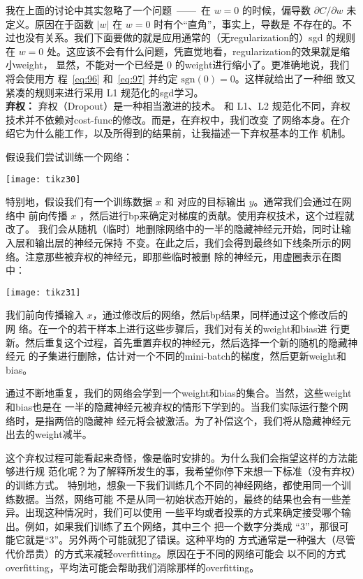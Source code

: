 我在上面的讨论中其实忽略了一个问题~——~在 $w=0$ 的时候，偏导数 $\partial
C/\partial w$ 未定义。原因在于函数 $|w|$ 在 $w=0$ 时有个“直角”，事实上，导数是
不存在的。不过也没有关系。我们下面要做的就是应用通常的（无\gls*{regularization}的）\gls*{sgd}
的规则在 $w=0$ 处。这应该不会有什么问题，凭直觉地看，\gls*{regularization}的效果就是缩小\gls*{weight}，
显然，不能对一个已经是 $0$ 的\gls*{weight}进行缩小了。更准确地说，我们将会使用方
程~\eqref{eq:96} 和~\eqref{eq:97} 并约定 $\mbox{sgn}(0) = 0$。这样就给出了一种细
致又紧凑的规则来进行采用 L1 规范化的\gls*{sgd}学习。\\

\textbf{弃权：} 弃权（Dropout）是一种相当激进的技术。
和 L1、L2 规范化不同，弃权技术并不依赖对\gls*{cost-func}的修改。而是，在弃权中，我们改变
了网络本身。在介绍它为什么能工作，以及所得到的结果前，让我描述一下弃权基本的工作
机制。

假设我们尝试训练一个网络：
\begin{center}
  \texttt{[image: tikz30]}
\end{center}

特别地，假设我们有一个训练数据 $x$ 和 对应的目标输出 $y$。通常我们会通过在网络中
前向传播 $x$ ，然后进行\gls*{bp}来确定对梯度的贡献。使用弃权技术，这个过程就改了。
我们会从随机（临时）地删除网络中的一半的隐藏神经元开始，同时让输入层和输出层的神经元保持
不变。在此之后，我们会得到最终如下线条所示的网络。注意那些被弃权的神经元，即那些临时被删
除的神经元，用虚圈表示在图中：
\begin{center}
  \texttt{[image: tikz31]}
\end{center}

我们前向传播输入 $x$，通过修改后的网络，然后\gls*{bp}结果，同样通过这个修改后的网
络。在一个的若干样本上进行这些步骤后，我们对有关的\gls*{weight}和\gls*{bias}进
行更新。然后重复这个过程，首先重置弃权的神经元，然后选择一个新的随机的隐藏神经元
的子集进行删除，估计对一个不同的\gls*{mini-batch}的梯度，然后更新\gls*{weight}和\gls*{bias}。

通过不断地重复，我们的网络会学到一个\gls*{weight}和\gls*{bias}的集合。当然，这些\gls*{weight}和\gls*{bias}也是在
一半的隐藏神经元被弃权的情形下学到的。当我们实际运行整个网络时，是指两倍的隐藏神
经元将会被激活。为了补偿这个，我们将从隐藏神经元出去的\gls*{weight}减半。

这个弃权过程可能看起来奇怪，像是临时安排的。为什么我们会指望这样的方法能够进行规
范化呢？为了解释所发生的事，我希望你停下来想一下标准（没有弃权）的训练方式。
特别地，想象一下我们训练几个不同的神经网络，都使用同一个训练数据。当然，网络可能
不是从同一初始状态开始的，最终的结果也会有一些差异。出现这种情况时，我们可以使用
一些平均或者投票的方式来确定接受哪个输出。例如，如果我们训练了五个网络，其中三个
把一个数字分类成 “3”，那很可能它就是“3”。另外两个可能就犯了错误。这种平均的
方式通常是一种强大（尽管代价昂贵）的方式来减轻\gls*{overfitting}。原因在于不同的网络可能会
以不同的方式\gls*{overfitting}，平均法可能会帮助我们消除那样的\gls*{overfitting}。

